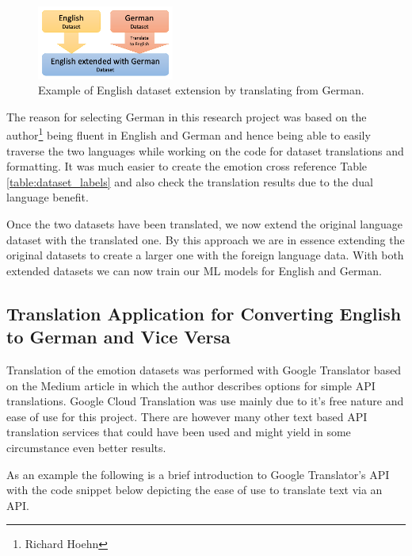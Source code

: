 \documentclass[11pt]{article}
\begin{document}
\begin{figure}[h]
    \centering
    \includegraphics[width=0.4\textwidth]{Dataset-Extension}
    \caption{Example of English dataset extension by translating from German.}
    \label{fig:dataset-extension}
\end{figure}

The reason for selecting German in this research project was based on the author\footnote{Richard Hoehn} being fluent in English and German and hence being able to easily traverse the two languages while working on the code for dataset translations and formatting. It was much easier to create the emotion cross reference Table \ref{table:dataset_labels} and also check the translation results due to the dual language benefit.

Once the two datasets have been translated, we now extend the original language dataset with the translated one. By this approach we are in essence extending the original datasets to create a larger one with the foreign language data. With both extended datasets we can now train our ML models for English and German.

\subsection{Translation Application for Converting English to German and Vice Versa}
Translation of the emotion datasets was performed with Google Translator based on the Medium article\cite{Nidhaloff_how_to_translate_text_with_python} in which the author describes options for simple API translations. Google Cloud Translation was use mainly due to it's free nature and ease of use for this project. There are however many other text based API translation services that could have been used and might yield in some circumstance even better results.

As an example the following is a brief introduction to Google Translator's API with the code snippet below depicting the ease of use to translate text via an API.
\end{document}

